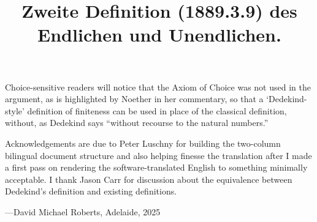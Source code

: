 \documentclass[leqno,hidelinks,10pt]{article}
\theoremstyle{definition}
\begin{document}
Choice-sensitive readers will notice that the Axiom of Choice was not used in the argument, as is highlighted by Noether in her commentary, so that a `Dedekind-style' definition of finiteness can be used in place of the classical definition, without, as Dedekind says ``without recourse to the natural numbers.''



Acknowledgements are due to Peter Luschny for building the two-column bilingual document structure and also helping finesse the translation after I made a first pass on rendering the software-translated English to something minimally acceptable.
I thank Jason Carr for discussion about the equivalence between Dedekind's definition and existing definitions.

\bigskip

---David Michael Roberts, Adelaide, 2025 

 


\newpage
{}

\title{Zweite Definition (1889.3.9) des Endlichen und Unendlichen.}

\maketitle

\end{document}
